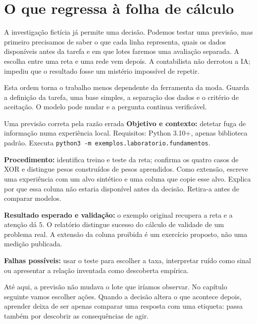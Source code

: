 \section{O que regressa à folha de cálculo}
A investigação fictícia já permite uma decisão. Podemos testar uma previsão, mas primeiro precisamos de saber o que cada linha representa, quais os dados disponíveis antes da tarefa e em que lotes faremos uma avaliação separada. A escolha entre uma reta e uma rede vem depois. A contabilista não derrotou a IA; impediu que o resultado fosse um mistério impossível de repetir.

Esta ordem torna o trabalho menos dependente da ferramenta da moda. Guarda a definição da tarefa, uma base simples, a separação dos dados e o critério de aceitação. O modelo pode mudar e a pergunta continua verificável.

\begin{promptlabbox}{Uma previsão correta pela razão errada}
\textbf{Objetivo e contexto:} detetar fuga de informação numa experiência local. Requisitos: Python 3.10+, apenas biblioteca padrão. Executa \texttt{python3 -m exemplos.laboratorio.fundamentos}.

\textbf{Procedimento:} identifica treino e teste da reta; confirma os quatro casos de XOR e distingue pesos construídos de pesos aprendidos. Como extensão, escreve uma experiência com um alvo sintético e uma coluna que copie esse alvo. Explica por que essa coluna não estaria disponível antes da decisão. Retira-a antes de comparar modelos.

\textbf{Resultado esperado e validação:} o exemplo original recupera a reta e a atenção dá $5$. O relatório distingue sucesso do cálculo de validade de um problema real. A extensão da coluna proibida é um exercício proposto, não uma medição publicada.

\textbf{Falhas possíveis:} usar o teste para escolher a taxa, interpretar ruído como sinal ou apresentar a relação inventada como descoberta empírica.
\end{promptlabbox}

Até aqui, a previsão não mudava o lote que iríamos observar. No capítulo seguinte vamos escolher ações. Quando a decisão altera o que acontece depois, aprender deixa de ser apenas comparar uma resposta com uma etiqueta: passa também por descobrir as consequências de agir.
